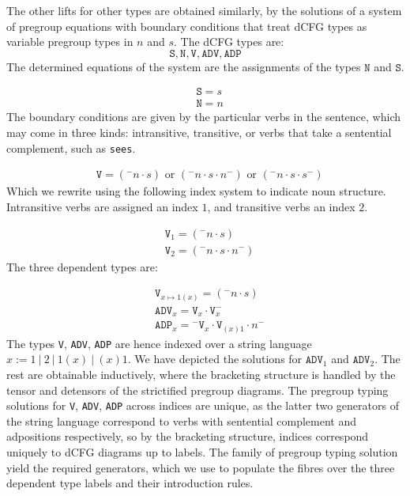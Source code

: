 \begin{myboxR}
The other lifts for other types are obtained similarly, by the solutions of a system of pregroup equations with boundary conditions that treat dCFG types as variable pregroup types in $n$ and $s$. The dCFG types are:
\[\texttt{S}, \texttt{N}, \texttt{V}, \texttt{ADV}, \texttt{ADP}\]
The determined equations of the system are the assignments of the types $\texttt{N}$ and $\texttt{S}$.

\begin{align*}
&\texttt{S} = s  \\
&\texttt{N} = n
\end{align*}
The boundary conditions are given by the particular verbs in the sentence, which may come in three kinds: intransitive, transitive, or verbs that take a sentential complement, such as \texttt{sees}.

\begin{align*}
&\texttt{V} = ({}^{-}n \cdot s) \text{ or } ({}^{-}n \cdot s \cdot n^{-}) \text{ or } ({}^{-}n \cdot s \cdot s^{-})
\end{align*}
Which we rewrite using the following index system to indicate noun structure. Intransitive verbs are assigned an index $1$, and transitive verbs an index $2$.

\begin{align*}
&\texttt{V}_1 = ({}^{-}n \cdot s)\\
&\texttt{V}_2 = ({}^{-}n \cdot s \cdot n^{-})
\end{align*}
The three dependent types are:

\begin{align*}
&\texttt{V}_{x \mapsto 1(x)} = ({}^{-}n \cdot s)\\
&\texttt{ADV}_x = \texttt{V}_x \cdot \texttt{V}_x^{-}\\
&\texttt{ADP}_x = {}^{-}\texttt{V}_x \cdot \texttt{V}_{(x)1} \cdot n^{-}
\end{align*}
The types \texttt{V}, \texttt{ADV}, \texttt{ADP} are hence indexed over a string language $x := 1 \ | \ 2 \ | \ 1(x) \ | \ (x)1$. We have depicted the solutions for $\texttt{ADV}_1$ and $\texttt{ADV}_2$. The rest are obtainable inductively, where the bracketing structure is handled by the tensor and detensors of the strictified pregroup diagrams. The pregroup typing solutions for \texttt{V}, \texttt{ADV}, \texttt{ADP} across indices are unique, as the latter two generators of the string language correspond to verbs with sentential complement and adpositions respectively, so by the bracketing structure, indices correspond uniquely to dCFG diagrams up to labels. The family of pregroup typing solution yield the required generators, which we use to populate the fibres over the three dependent type labels and their introduction rules.
\end{myboxR}

